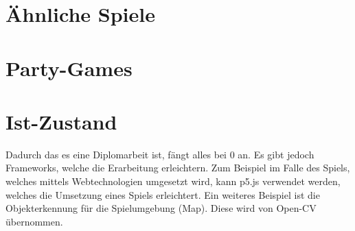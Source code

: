 \section{Ähnliche Spiele}
\section{Party-Games}
\section{Ist-Zustand}
Dadurch das es eine Diplomarbeit ist, fängt alles bei 0 an. Es gibt jedoch Frameworks,
welche die Erarbeitung erleichtern. Zum Beispiel im Falle des Spiels, welches
mittels Webtechnologien umgesetzt wird, kann p5.js verwendet werden, welches die
Umsetzung eines Spiels erleichtert. Ein weiteres Beispiel ist die Objekterkennung für
die Spielumgebung (Map). Diese wird von Open-CV übernommen.